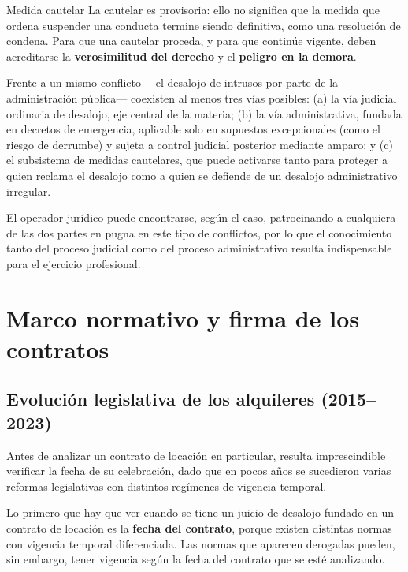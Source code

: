 \documentclass[12pt,oneside]{book}
\begin{document}
\begin{definition}{Medida cautelar}
La cautelar es provisoria: ello no significa que la medida que ordena suspender una conducta termine siendo definitiva, como una resolución de condena. Para que una cautelar proceda, y para que continúe vigente, deben acreditarse la \textbf{verosimilitud del derecho} y el \textbf{peligro en la demora}.
\end{definition}

\begin{important}
Frente a un mismo conflicto ---el desalojo de intrusos por parte de la administración pública--- coexisten al menos tres vías posibles: (a) la vía judicial ordinaria de desalojo, eje central de la materia; (b) la vía administrativa, fundada en decretos de emergencia, aplicable solo en supuestos excepcionales (como el riesgo de derrumbe) y sujeta a control judicial posterior mediante amparo; y (c) el subsistema de medidas cautelares, que puede activarse tanto para proteger a quien reclama el desalojo como a quien se defiende de un desalojo administrativo irregular.
\end{important}

El operador jurídico puede encontrarse, según el caso, patrocinando a cualquiera de las dos partes en pugna en este tipo de conflictos, por lo que el conocimiento tanto del proceso judicial como del proceso administrativo resulta indispensable para el ejercicio profesional.

\chapter{Marco normativo y firma de los contratos}
\label{cap:normativo}

\section{Evolución legislativa de los alquileres (2015--2023)}

Antes de analizar un contrato de locación en particular, resulta imprescindible verificar la fecha de su celebración, dado que en pocos años se sucedieron varias reformas legislativas con distintos regímenes de vigencia temporal.

\begin{important}
Lo primero que hay que ver cuando se tiene un juicio de desalojo fundado en un contrato de locación es la \textbf{fecha del contrato}, porque existen distintas normas con vigencia temporal diferenciada. Las normas que aparecen derogadas pueden, sin embargo, tener vigencia según la fecha del contrato que se esté analizando.
\end{important}
\end{document}
